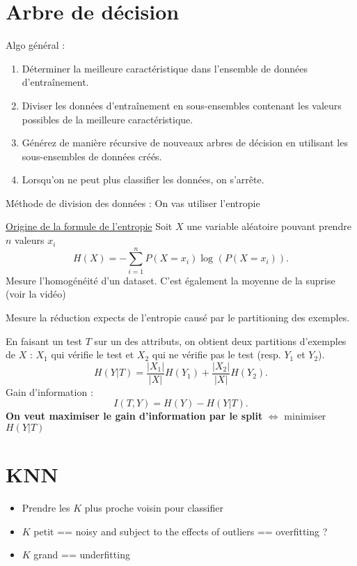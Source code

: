 \documentclass{article}
\begin{document}
\section{Arbre de décision}
Algo général : 
\begin{enumerate}
    \item Déterminer la meilleure caractéristique dans l'ensemble de données d'entraînement.
    \item Diviser les données d'entraînement en sous-ensembles contenant les valeurs possibles de la meilleure caractéristique.
    \item Générez de manière récursive de nouveaux arbres de décision en utilisant les sous-ensembles de données créés.
    \item Lorsqu'on ne peut plus classifier les données, on s'arrête.
\end{enumerate}
Méthode de division des données : On vas utiliser l'entropie 
\begin{defn}[Entropie]   
    \href{https://www.youtube.com/watch?v=YtebGVx-Fxw}{Origine de la formule de l'entropie}
    Soit $ X $ une variable aléatoire pouvant prendre $ n $ valeurs $ x_i $ 
    \[
        H(X) = - \sum_{i=1}^{n}P(X = x_i)\log_{} (P(X = x_i))
    .\]
    Mesure l'homogénéité d'un dataset. C'est également la moyenne de la suprise (voir la vidéo)
\end{defn}
\begin{defn}
    Mesure la réduction expects de l'entropie causé par le partitioning des exemples.

    En faisant un test $T$ sur un des attributs, on obtient deux partitions d'exemples de $X$ : $X_1$ qui vérifie le test et $X_2$ qui ne vérifie pas le test (resp. $Y_1$ et $Y_2$).
    \[
        H(Y|T) = \frac{\left| X_1 \right| }{\left| X \right| } H(Y_1) + \frac{\left| X_2 \right| }{\left| X \right| } H(Y_2)
    .\]
    Gain d'information : 
    \[
        I(T, Y) = H(Y) - H(Y|T)
    .\]
    \textbf{On veut maximiser le gain d'information par le split} $ \Leftrightarrow $ minimiser $ H(Y|T) $ 
\end{defn}

\section{KNN}
\begin{itemize}
    \item Prendre les $ K $ plus proche voisin pour classifier 
    \item $ K $ petit == noisy and subject to the effects of outliers == overfitting ? 
    \item $ K $ grand == underfitting
\end{itemize}
\end{document}
